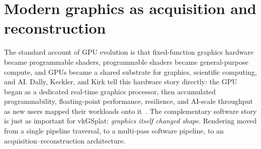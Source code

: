 \documentclass[10pt,journal]{IEEEtran}
\begin{document}
\section{Modern graphics as acquisition and reconstruction}
\label{sec:acqrec}

The standard account of GPU evolution is that fixed-function graphics
hardware became programmable shaders, programmable shaders became
general-purpose compute, and GPUs became a shared substrate for
graphics, scientific computing, and AI. Dally, Keckler, and Kirk tell
this hardware story directly: the GPU began as a dedicated real-time
graphics processor, then accumulated programmability, floating-point
performance, resilience, and AI-scale throughput as new users mapped
their workloads onto it~\cite{dally2021gpu}. The complementary software
story is just as important for vkGSplat: \emph{graphics itself changed
shape}. Rendering moved from a single pipeline traversal, to a
multi-pass software pipeline, to an acquisition--reconstruction
architecture.
\end{document}
